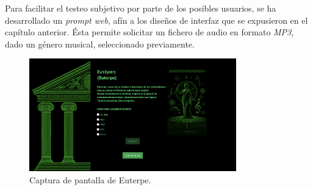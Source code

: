 Para facilitar el testeo subjetivo por parte de los posibles usuarios, se ha desarrollado un \emph{prompt web}, afín a los diseños de interfaz que se expusieron en el capítulo anterior. Ésta permite solicitar un fichero de audio en formato \emph{MP3}, dado un género musical, seleccionado previamente.

\begin{figure}[H]
    \centering
    \includegraphics[width=0.8\textwidth]{images/euterpe-screenshot.png}
    \caption{Captura de pantalla de Euterpe.}
\end{figure}

